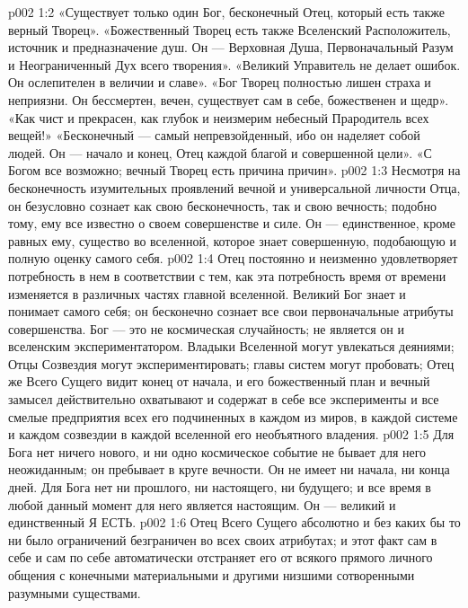 \vs p002 1:2 «Существует только один Бог, бесконечный Отец, который есть также верный Творец». «Божественный Творец есть также Вселенский Расположитель, источник и предназначение душ. Он --- Верховная Душа, Первоначальный Разум и Неограниченный Дух всего творения». «Великий Управитель не делает ошибок. Он ослепителен в величии и славе». «Бог Творец полностью лишен страха и неприязни. Он бессмертен, вечен, существует сам в себе, божественен и щедр». «Как чист и прекрасен, как глубок и неизмерим небесный Прародитель всех вещей!» «Бесконечный --- самый непревзойденный, ибо он наделяет собой людей. Он --- начало и конец, Отец каждой благой и совершенной цели». «С Богом все возможно; вечный Творец есть причина причин».
\vs p002 1:3 \pc Несмотря на бесконечность изумительных проявлений вечной и универсальной личности Отца, он безусловно сознает как свою бесконечность, так и свою вечность; подобно тому, ему все известно о своем совершенстве и силе. Он --- единственное, кроме равных ему, существо во вселенной, которое знает совершенную, подобающую и полную оценку самого себя.
\vs p002 1:4 Отец постоянно и неизменно удовлетворяет потребность в нем в соответствии с тем, как эта потребность время от времени изменяется в различных частях главной вселенной. Великий Бог знает и понимает самого себя; он бесконечно сознает все свои первоначальные атрибуты совершенства. Бог --- это не космическая случайность; не является он и вселенским экспериментатором. Владыки Вселенной могут увлекаться деяниями; Отцы Созвездия могут экспериментировать; главы систем могут пробовать; Отец же Всего Сущего видит конец от начала, и его божественный план и вечный замысел действительно охватывают и содержат в себе все эксперименты и все смелые предприятия всех его подчиненных в каждом из миров, в каждой системе и каждом созвездии в каждой вселенной его необъятного владения.
\vs p002 1:5 Для Бога нет ничего нового, и ни одно космическое событие не бывает для него неожиданным; он пребывает в круге вечности. Он не имеет ни начала, ни конца дней. Для Бога нет ни прошлого, ни настоящего, ни будущего; и все время в любой данный момент для него является настоящим. Он --- великий и единственный Я ЕСТЬ.
\vs p002 1:6 \pc Отец Всего Сущего абсолютно и без каких бы то ни было ограничений безграничен во всех своих атрибутах; и этот факт сам в себе и сам по себе автоматически отстраняет его от всякого прямого личного общения с конечными материальными и другими низшими сотворенными разумными существами.
